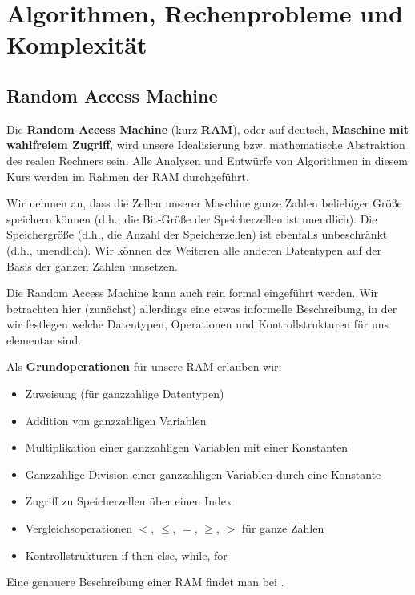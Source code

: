 \section{Algorithmen, Rechenprobleme und Komplexität}

\subsection{Random Access Machine}
\label{sect:RAM}

\begin{bem} 
Die \textbf{Random Access Machine} (kurz \textbf{RAM}), oder auf deutsch, \textbf{Maschine mit wahlfreiem Zugriff}, wird unsere Idealisierung bzw. mathematische Abstraktion des realen Rechners sein. Alle Analysen und Entwürfe von Algorithmen in diesem Kurs werden im Rahmen der RAM durchgeführt. 

Wir nehmen an, dass die Zellen unserer Maschine ganze Zahlen beliebiger Größe speichern können (d.h., die Bit-Größe der Speicherzellen ist unendlich). Die Speichergröße (d.h., die Anzahl der Speicherzellen) ist ebenfalls unbeschränkt (d.h., unendlich). Wir können des Weiteren alle anderen Datentypen auf der Basis der ganzen Zahlen umsetzen. 

Die Random Access Machine kann auch rein formal eingeführt werden. Wir betrachten hier (zunächst) allerdings eine etwas informelle Beschreibung, in der wir festlegen welche Datentypen, Operationen und Kontrollstrukturen für uns elementar sind. 

Als \textbf{Grundoperationen} für unsere RAM erlauben wir:
%
\begin{itemize}
	\item Zuweisung (für ganzzahlige Datentypen)
	\item Addition von ganzzahligen Variablen
	\item Multiplikation einer ganzzahligen Variablen mit einer Konstanten
	\item Ganzzahlige Division einer ganzzahligen Variablen durch eine Konstante
	\item Zugriff zu Speicherzellen über einen Index
	\item Vergleichsoperationen $<$, $\le$, $=$, $\ge$, $>$ für ganze Zahlen
	\item Kontrollstrukturen if-then-else, while, for 
\end{itemize}

Eine genauere Beschreibung einer RAM findet man bei \cite[Sect.~1.3]{Lov20}.
\end{bem} 

